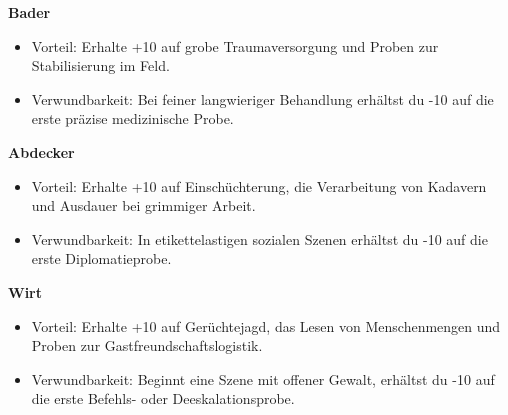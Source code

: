 \noindent\textbf{Bader}\par
\begin{itemize}[leftmargin=*,nosep]
\item Vorteil: Erhalte +10 auf grobe Traumaversorgung und Proben zur Stabilisierung im Feld.
\item Verwundbarkeit: Bei feiner langwieriger Behandlung erhältst du -10 auf die erste präzise medizinische Probe.
\end{itemize}
\noindent\textbf{Abdecker}\par
\begin{itemize}[leftmargin=*,nosep]
\item Vorteil: Erhalte +10 auf Einschüchterung, die Verarbeitung von Kadavern und Ausdauer bei grimmiger Arbeit.
\item Verwundbarkeit: In etikettelastigen sozialen Szenen erhältst du -10 auf die erste Diplomatieprobe.
\end{itemize}
\noindent\textbf{Wirt}\par
\begin{itemize}[leftmargin=*,nosep]
\item Vorteil: Erhalte +10 auf Gerüchtejagd, das Lesen von Menschenmengen und Proben zur Gastfreundschaftslogistik.
\item Verwundbarkeit: Beginnt eine Szene mit offener Gewalt, erhältst du -10 auf die erste Befehls- oder Deeskalationsprobe.
\end{itemize}


